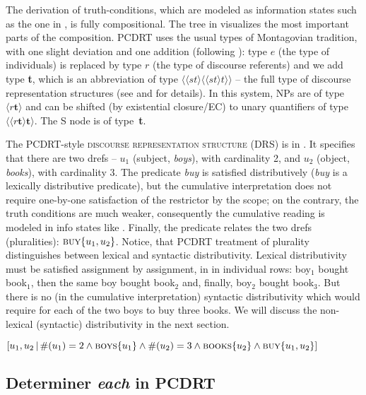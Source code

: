 \documentclass[output=paper,colorlinks,citecolor=brown,newtxmath]{langscibook}
\begin{document}
The derivation of truth-conditions, which are modeled as information states such as the one in , is fully compositional. The tree in  visualizes the most important parts of the composition. PCDRT uses the usual types of Montagovian tradition, with one slight deviation and one addition (following \citealt{Dotlacil2012}): type $e$ (the type of individuals) is replaced by type $r$ (the type of discourse referents) and we add type \textbf{t}, which is an abbreviation of type $\langle\langle st\rangle\langle\langle st\rangle t\rangle\rangle$ -- the full type of discourse representation structures (see \citealt{Dotlacil2013} and \citealt{Brasoveanu2008} for details). In this system, NPs are of type $\langle r\textbf{t}\rangle$ and can be shifted (by existential closure/EC) to unary quantifiers of type $\langle\langle r\textbf{t}\rangle \textbf{t}\rangle$. The S node is of type~\textbf{t}.

The PCDRT-style \textsc{discourse representation structure} (DRS) is in . It specifies that there are two drefs -- $u_1$ (subject, \textit{boys}), with cardinality 2, and $u_2$ (object, \textit{books}), with cardinality 3. The predicate \textit{buy} is satisfied distributively (\textit{buy} is a lexically distributive predicate), but the cumulative interpretation does not require one-by-one satisfaction of the restrictor by the scope; on the contrary, the truth conditions are much weaker, consequently the cumulative reading is modeled in info states like . Finally, the predicate relates the two drefs (pluralities): $\textsc{buy}\{u_1,u_2\}$. Notice, that PCDRT treatment of plurality distinguishes between lexical and syntactic distributivity. Lexical distributivity must be satisfied assignment by assignment, in  in individual rows: boy$_1$ bought book$_1$, then the same boy bought book$_2$ and, finally, boy$_2$ bought book$_3$. But there is no (in the cumulative interpretation) syntactic distributivity which would require for each of the two boys to buy three books. We will discuss the non-lexical (syntactic) distributivity in the next section.

\ea\label{sem:line416}
\([u_1, u_2\,|\,\#(u_1)=2 \wedge \textsc{boys}\{u_1\} \wedge \#(u_2)=3 \wedge \textsc{books}\{u_2\} \wedge \textsc{buy}\{u_1,u_2\}]\)
\z

\subsection{Determiner \textit{each} in PCDRT}\label{determiner-each-in-pcdrt}
\end{document}
